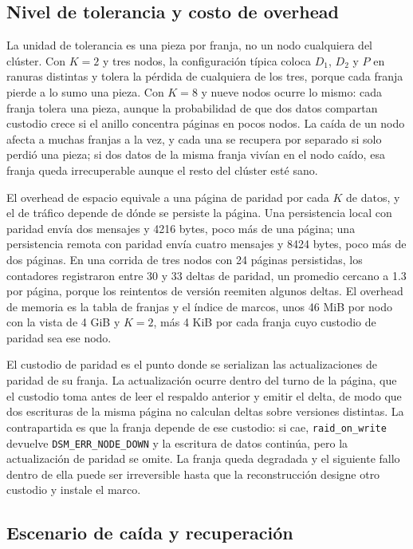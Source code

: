 \subsection{Nivel de tolerancia y costo de overhead}

La unidad de tolerancia es una pieza por franja, no un nodo cualquiera del clúster. Con $K=2$ y tres nodos, la configuración típica coloca $D_1$, $D_2$ y $P$ en ranuras distintas y tolera la pérdida de cualquiera de los tres, porque cada franja pierde a lo sumo una pieza. Con $K=8$ y nueve nodos ocurre lo mismo: cada franja tolera una pieza, aunque la probabilidad de que dos datos compartan custodio crece si el anillo concentra páginas en pocos nodos. La caída de un nodo afecta a muchas franjas a la vez, y cada una se recupera por separado si solo perdió una pieza; si dos datos de la misma franja vivían en el nodo caído, esa franja queda irrecuperable aunque el resto del clúster esté sano.

El overhead de espacio equivale a una página de paridad por cada $K$ de datos, y el de tráfico depende de dónde se persiste la página. Una persistencia local con paridad envía dos mensajes y 4216 bytes, poco más de una página; una persistencia remota con paridad envía cuatro mensajes y 8424 bytes, poco más de dos páginas. En una corrida de tres nodos con 24 páginas persistidas, los contadores registraron entre 30 y 33 deltas de paridad, un promedio cercano a 1.3 por página, porque los reintentos de versión reemiten algunos deltas. El overhead de memoria es la tabla de franjas y el índice de marcos, unos 46 MiB por nodo con la vista de 4 GiB y $K=2$, más 4 KiB por cada franja cuyo custodio de paridad sea ese nodo.

El custodio de paridad es el punto donde se serializan las actualizaciones de paridad de su franja. La actualización ocurre dentro del turno de la página, que el custodio toma antes de leer el respaldo anterior y emitir el delta, de modo que dos escrituras de la misma página no calculan deltas sobre versiones distintas. La contrapartida es que la franja depende de ese custodio: si cae, \texttt{raid\_on\_write} devuelve \texttt{DSM\_ERR\_NODE\_DOWN} y la escritura de datos continúa, pero la actualización de paridad se omite. La franja queda degradada y el siguiente fallo dentro de ella puede ser irreversible hasta que la reconstrucción designe otro custodio y instale el marco.

\subsection{Escenario de caída y recuperación}

